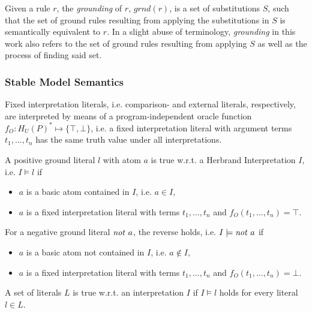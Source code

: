 \begin{definition}[Grounding]
\label{def:prelims-asp-semantics-grounding}
Given a rule $r$, the \emph{grounding} of $r$, $\mathit{grnd}(r)$, is a set of substitutions $S$, such that the set of ground rules resulting from applying the substitutions in $S$ is semantically equivalent to $r$. In a slight abuse of terminology, \emph{grounding} in this work also refers to the set of ground rules resulting from applying $S$ as well as the process of finding said set.
\end{definition}

\subsubsection{Stable Model Semantics}
\label{subsubsec:prelims-asp-semantics-stable-models}

\begin{definition}
\label{def:prelims-asp-semantics-fixedinterpretation-literals}	
Fixed interpretation literals, i.e. comparison- and external literals, respectively, are interpreted by means of a program-independent oracle function $f_O : H_{U}(P)^{*} \mapsto \{ \top, \bot \}$, i.e. a fixed interpretation literal with argument terms $t_1,\ldots,t_n$ has the same truth value under all interpretations.
\end{definition}

\begin{definition}
\label{def:prelims-asp-semantics-truth}
A positive ground literal $l$ with atom $a$ is true w.r.t. a Herbrand Interpretation $I$, i.e. $I \models l$ if
\begin{itemize}
	\item $a$ is a basic atom contained in $I$, i.e. $a \in I$,
	\item $a$ is a fixed interpretation literal with terms $t_1,\ldots,t_n$ and $f_O(t_1,\ldots,t_n) = \top$.
\end{itemize} 
For a negative ground literal $\NOT\ a$, the reverse holds, i.e. $I \models \mathit{not}\ a$ if
\begin{itemize}
	\item $a$ is a basic atom not contained in $I$, i.e. $a \notin I$,
	\item $a$ is a fixed interpretation literal with terms $t_1,\ldots,t_n$ and $f_O(t_1,\ldots,t_n) = \bot$.
\end{itemize} 
A set of literals $L$ is true w.r.t. an interpretation $I$ if $I \models l$ holds for every literal $l \in L$. 
\end{definition}

